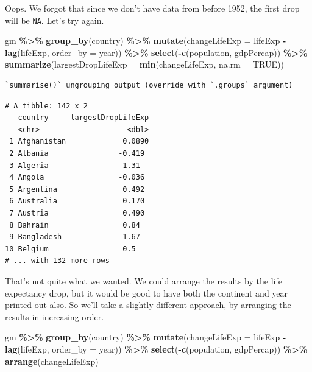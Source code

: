 \documentclass[
]{krantz}
\makeatletter
\newenvironment{Shaded}{\begin{snugshade}}{\end{snugshade}}
\newcommand{\DataTypeTok}[1]{\textcolor[rgb]{0.27,0.27,0.27}{#1}}
\newcommand{\KeywordTok}[1]{\textcolor[rgb]{0.27,0.27,0.27}{\textbf{#1}}}
\newcommand{\NormalTok}[1]{#1}
\newcommand{\OperatorTok}[1]{\textcolor[rgb]{0.43,0.43,0.43}{\textbf{#1}}}
\newcommand{\OtherTok}[1]{\textcolor[rgb]{0.37,0.37,0.37}{#1}}
\newcommand{\StringTok}[1]{\textcolor[rgb]{0.5,0.5,0.5}{#1}}
\newenvironment{kframe}{%
\medskip{}
\setlength{\fboxsep}{.8em}
 \def\at@end@of@kframe{}%
 \ifinner\ifhmode%
  \def\at@end@of@kframe{\end{minipage}}%
  \begin{minipage}{\columnwidth}%
 \fi\fi%
 \def\FrameCommand##1{\hskip\@totalleftmargin \hskip-\fboxsep
 \colorbox{shadecolor}{##1}\hskip-\fboxsep
     \hskip-\linewidth \hskip-\@totalleftmargin \hskip\columnwidth}%
 \MakeFramed {\advance\hsize-\width
   \@totalleftmargin\z@ \linewidth\hsize
   \@setminipage}}%
 {\par\unskip\endMakeFramed%
 \at@end@of@kframe}
\renewenvironment{Shaded}{\begin{kframe}}{\end{kframe}}
\makeatother
\begin{document}
Oops. We forgot that since we don't have data from before 1952, the first drop will be \texttt{NA}. Let's try again.

\begin{Shaded}
\begin{Highlighting}[]
\NormalTok{gm }\OperatorTok{\%\textgreater{}\%}\StringTok{ }
\StringTok{  }\KeywordTok{group\_by}\NormalTok{(country) }\OperatorTok{\%\textgreater{}\%}\StringTok{ }
\StringTok{  }\KeywordTok{mutate}\NormalTok{(}\DataTypeTok{changeLifeExp =}\NormalTok{ lifeExp }\OperatorTok{{-}}\StringTok{ }\KeywordTok{lag}\NormalTok{(lifeExp, }\DataTypeTok{order\_by =}\NormalTok{ year)) }\OperatorTok{\%\textgreater{}\%}\StringTok{ }
\StringTok{  }\KeywordTok{select}\NormalTok{(}\OperatorTok{{-}}\KeywordTok{c}\NormalTok{(population, gdpPercap)) }\OperatorTok{\%\textgreater{}\%}\StringTok{ }
\StringTok{  }\KeywordTok{summarize}\NormalTok{(}\DataTypeTok{largestDropLifeExp =} \KeywordTok{min}\NormalTok{(changeLifeExp, }\DataTypeTok{na.rm =} \OtherTok{TRUE}\NormalTok{))}
\end{Highlighting}
\end{Shaded}

\begin{verbatim}
`summarise()` ungrouping output (override with `.groups` argument)
\end{verbatim}

\begin{verbatim}
# A tibble: 142 x 2
   country     largestDropLifeExp
   <chr>                    <dbl>
 1 Afghanistan             0.0890
 2 Albania                -0.419 
 3 Algeria                 1.31  
 4 Angola                 -0.036 
 5 Argentina               0.492 
 6 Australia               0.170 
 7 Austria                 0.490 
 8 Bahrain                 0.84  
 9 Bangladesh              1.67  
10 Belgium                 0.5   
# ... with 132 more rows
\end{verbatim}

That's not quite what we wanted. We could arrange the results by the life expectancy drop, but it would be good to have both the continent and year printed out also. So we'll take a slightly different approach, by arranging the results in increasing order.

\begin{Shaded}
\begin{Highlighting}[]
\NormalTok{gm }\OperatorTok{\%\textgreater{}\%}\StringTok{ }
\StringTok{  }\KeywordTok{group\_by}\NormalTok{(country) }\OperatorTok{\%\textgreater{}\%}\StringTok{ }
\StringTok{  }\KeywordTok{mutate}\NormalTok{(}\DataTypeTok{changeLifeExp =}\NormalTok{ lifeExp }\OperatorTok{{-}}\StringTok{ }\KeywordTok{lag}\NormalTok{(lifeExp, }\DataTypeTok{order\_by =}\NormalTok{ year)) }\OperatorTok{\%\textgreater{}\%}\StringTok{ }
\StringTok{  }\KeywordTok{select}\NormalTok{(}\OperatorTok{{-}}\KeywordTok{c}\NormalTok{(population, gdpPercap)) }\OperatorTok{\%\textgreater{}\%}\StringTok{ }
\StringTok{  }\KeywordTok{arrange}\NormalTok{(changeLifeExp)}
\end{Highlighting}
\end{Shaded}
\end{document}
